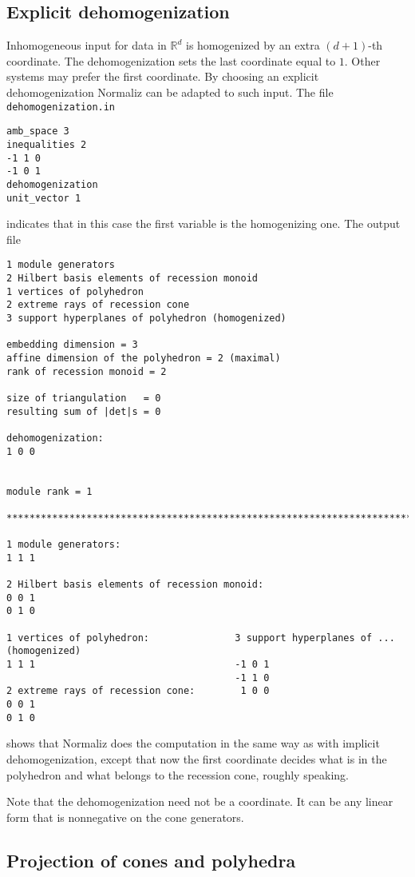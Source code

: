\documentclass[12pt,a4paper]{scrartcl}
\theoremstyle{definition}
\def\RR{{\mathbb R}}
\begin{document}
\subsection{Explicit dehomogenization}\label{dehom_ex}
Inhomogeneous input for data in $\RR^{d}$ is homogenized by an extra $(d+1)$-th coordinate. The dehomogenization sets the last coordinate equal to $1$. Other systems may prefer the first coordinate. By choosing an explicit dehomogenization Normaliz can be adapted to such input. The file \verb|dehomogenization.in|
\begin{Verbatim}
amb_space 3
inequalities 2
-1 1 0
-1 0 1
dehomogenization
unit_vector 1
\end{Verbatim}
indicates that in this case the first variable is the homogenizing one. The output file
\begin{Verbatim}
1 module generators
2 Hilbert basis elements of recession monoid
1 vertices of polyhedron
2 extreme rays of recession cone
3 support hyperplanes of polyhedron (homogenized)

embedding dimension = 3
affine dimension of the polyhedron = 2 (maximal)
rank of recession monoid = 2

size of triangulation   = 0
resulting sum of |det|s = 0

dehomogenization:
1 0 0 


module rank = 1

***********************************************************************

1 module generators:
1 1 1

2 Hilbert basis elements of recession monoid:
0 0 1
0 1 0

1 vertices of polyhedron:               3 support hyperplanes of ... (homogenized)
1 1 1                                   -1 0 1
                                        -1 1 0
2 extreme rays of recession cone:        1 0 0
0 0 1
0 1 0
\end{Verbatim}
shows that Normaliz does the computation in the same way as with implicit dehomogenization, except that now the first coordinate decides what is in the polyhedron and what belongs to the recession cone, roughly speaking.

Note that the dehomogenization need not be a coordinate. It can be any linear form that is nonnegative on the cone generators.

\subsection{Projection of cones and polyhedra}\label{Proj_cone}
\end{document}
